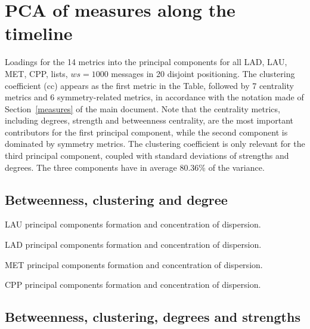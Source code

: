 \documentclass[%
 aip,
 jmp,%
 amsmath,amssymb,
 reprint,%
 floatfix,
]{revtex4-1}
\begin{document}
\FloatBarrier
\section{PCA of measures along the timeline}\label{si:pcat}
Loadings for the 14 metrics into the principal components for all LAD, LAU, MET, CPP, lists, $ws=1000$ messages in 20 disjoint positioning. The clustering coefficient (cc) appears as the first metric in the Table, followed by 7 centrality metrics and 6 symmetry-related metrics, in accordance with the notation made of Section~\ref{measures} of the main document. Note that the centrality metrics, including degrees, strength and betweenness centrality, are the most important contributors for the first principal component, while the second component is dominated by symmetry metrics. The clustering coefficient is only relevant for the third principal component, coupled with standard deviations of strengths and degrees. The three components have in average 80.36\% of the variance.
\subsection{Betweenness, clustering and degree}

\begin{table}[!h]
	\caption{LAU principal components formation and concentration of dispersion.}
	\footnotesize
	
\label{tab:pcain}
\end{table}

\begin{table}[!h]
	\caption{LAD principal components formation and concentration of dispersion.}
	\footnotesize
	
\label{tab:pcain}
\end{table}

\begin{table}[!h]
	\caption{MET principal components formation and concentration of dispersion.}
	\footnotesize
	
\label{tab:pcain}
\end{table}

\begin{table}[!h]
	\caption{CPP principal components formation and concentration of dispersion.}
	\footnotesize
	
\label{tab:pcain}
\end{table}

\FloatBarrier
\subsection{Betweenness, clustering, degrees and strengths}
\end{document}
